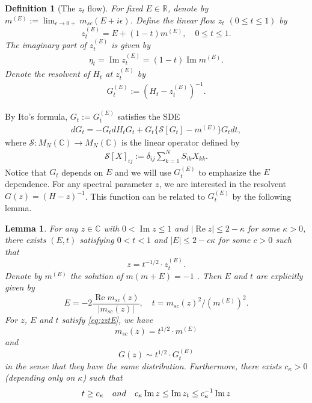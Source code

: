 \documentclass[10pt,reqno]{article}
\DeclareMathOperator{\re}{{\mathrm{Re}}}
\DeclareMathOperator{\im}{{\mathrm{Im}}}
\newcommand{\C}{\mathbb C}
\theoremstyle{plain} %
\newtheorem{lemma}[theorem]{Lemma}
\newtheorem{definition}[theorem]{Definition}
\theoremstyle{remark}
\numberwithin{equation}{section}
\begin{document}
\begin{definition}[The $z_t$ flow]\label{def_flow}
For fixed $E \in \mathbb R$,  %
denote by $
m^{(E)}:=\lim_{\epsilon\to 0+}m_{sc}(E+i \epsilon)$.
Define the linear flow  $z_t$  $(0\le t\le 1)$ by 
$$
  z^{(E)}_t=E+(1-t) m^{(E)}  ,\quad 0\le t\le 1.   
$$
The imaginary part of $ z^{(E)}_t$ is given by 
\begin{align}\label{eta}
\eta_t = \im  z^{(E)}_t =  (1-t)  \im m^{(E)}.
\end{align}
Denote the resolvent of $H_{t}$ at  $z^{(E)}_t$ by 
\begin{align}
G_{t}^{(E)}:=(H_{t}-z^{(E)}_t)^{-1}.
\end{align}
\end{definition}
 
By Ito's formula, $G_{t} := G_{t}^{(E)}$ satisfies the SDE
\begin{align}\nonumber
dG_{t}=-G_{t}dH_{t}G_{t}+G_{t}\{\mathcal{S}[G_{t}]-m^{(E)}\}G_{t}
dt,
\end{align}
where $\mathcal{S}:M_{N}(\C)\to M_{N}(\C)$ is the linear operator defined by
\begin{align*}
\mathcal{S}[X]_{ij}:=\delta_{ij}\sum_{k=1}^{N}S_{ik}X_{kk}.
\end{align*}
Notice that $G_{t}$ depends on $E$ and  we will use $G^{(E)}_{t}$  to emphasize the $E$ dependence. 
 For any spectral parameter $z$, we are interested in the resolvent  $G(z)=(H-z)^{-1} $. This function can be related to $G_{t}^{(E)}$ by the following lemma. 
\begin{lemma}\label{zztE}
    For any $z\in \mathbb C$ with $0 <  \im z\le 1$ and $|\re z|\le  2-\kappa$ for some $\kappa>0$, there exists  $(E, t)$ satisfying $0 <   t<1$ and  $|E|\le 2- c \kappa$ for some $c > 0$  such that
\begin{equation}\label{eq:zztE}
     z=t^{-1/2}\cdot z^{(E)}_t.
\end{equation}
Denote by $m^{(E)} $ the solution of $m (m+  E) =- 1$ . Then $E$ and $t$ are explicitly given by  
\[
 E =  - 2 \frac {  \re  m_{sc} (z)} {  |m_{sc} (z) |}, \quad t  = m_{sc} (z)^2/(m^{(E)})^2.
\]
For $z$, $E$ and $t$ satisfy \eqref{eq:zztE}, we have 
\begin{equation}\label{mtEmz}
  m_{sc}(z)=t^{1/2}\cdot m^{(E)} %
\end{equation}
and 
   \begin{equation}\label{GtEGz}
    G(z) \sim t^{ 1/2}\cdot G_t^{(E)} 
   \end{equation}
in the sense that they have the same distribution. 
Furthermore, there  exists $c_\kappa>0$ (depending only on $\kappa$) such that 
  \begin{equation}\label{eq:zztE2}
       t\ge c_\kappa \quad {\rm and}\quad  c_\kappa\im z\le \im z_t\le c_\kappa^{-1}\im z
\end{equation} 
\end{lemma}
\end{document}
